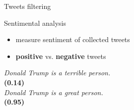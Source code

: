 \documentclass{beamer}
\begin{document}
\begin{frame}[fragile]
\begin{columns}[T]
\begin{column}{.33\textwidth}
\begin{block}{Tweets filtering}
\begin{itemize}
\end{itemize}
\end{block}
\begin{block}{Sentimental analysis}
\begin{itemize}
    \item measure sentiment of collected tweets
    \item \textbf{positive} vs. \textbf{negative} tweets
\end{itemize}
\center
\textit{Donald Trump is a terrible person.}\\
\textbf{(0.14)}\\
\vspace{0.5cm}
\textit{Donald Trump is a great person.}\\
\textbf{(0.95)}
\end{block}

\end{column}
\begin{column}{.63\textwidth}


\end{column}
\end{columns}
\end{frame}
\end{document}
